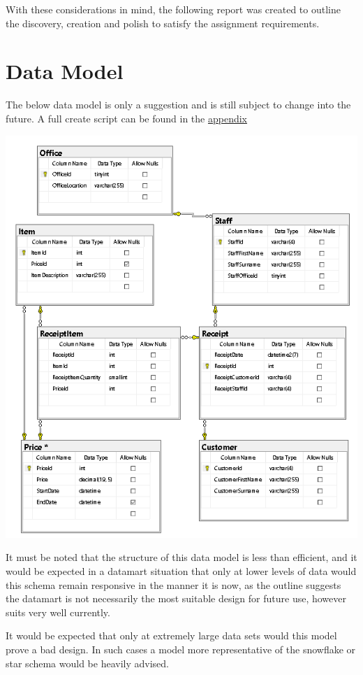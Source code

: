 \documentclass{article}
\begin{document}
    With these considerations in mind, the following report was created to outline
    the discovery, creation and polish to satisfy the assignment requirements.

    \newpage
    \section{Data Model}
    The below data model is only a suggestion and is still subject to change into the future. A full create script can be found in the \hyperref[sec:Appendix]{\color{blue}appendix}
        \begin{center}
            \includegraphics[width=\textwidth]{Images/Suggested_Schema.PNG}
        \end{center}
    It must be noted that the structure of this data model is 
    less than efficient, and it would be expected in a datamart
    situation that only at lower levels of data would this schema
    remain responsive in the manner it is now, as the outline
    suggests the datamart is not necessarily the most suitable
    design for future use, however suits very well currently.
    \par
    It would be expected that only at extremely large data sets
    would this model prove a bad design. In such cases a model 
    more representative of the snowflake or star schema would be
    heavily advised.
\end{document}
